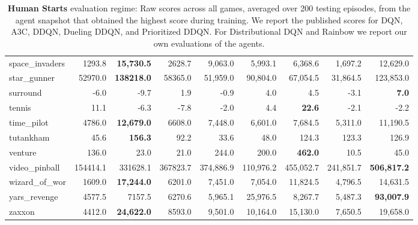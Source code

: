 \documentclass[letterpaper]{article} %
\begin{document}
\begin{table*}[t]
{\begin{tabular}{l|rrrrrrrr}
    space\_invaders &    1293.8 &   {\bf 15,730.5 }&    2628.7 &     9,063.0 &    5,993.1 &        6,368.6 &    1,697.2 &   12,629.0 \\
       star\_gunner &   52970.0 & {\bf  138218.0 }&   58365.0 &    51,959.0 &   90,804.0 &       67,054.5 &   31,864.5 &  123,853.0 \\
          surround &      -6.0 &      -9.7 &       1.9 &        -0.9 &        4.0 &            4.5 &       -3.1 &      {\bf   7.0} \\
            tennis &      11.1 &      -6.3 &      -7.8 &        -2.0 &        4.4 &          {\bf  22.6 }&       -2.1 &       -2.2 \\
        time\_pilot &    4786.0 &  {\bf  12,679.0} &    6608.0 &     7,448.0 &    6,601.0 &        7,684.5 &    5,311.0 &   11,190.5 \\
         tutankham &      45.6 &    {\bf  156.3 }&      92.2 &        33.6 &       48.0 &          124.3 &      123.3 &      126.9 \\
           venture &     136.0 &      23.0 &      21.0 &       244.0 &      200.0 &          {\bf 462.0} &       10.5 &       45.0 \\
     video\_pinball &  154414.1 &  331628.1 &  367823.7 &   374,886.9 &  110,976.2 &      455,052.7 &  241,851.7 & {\bf  506,817.2 }\\
     wizard\_of\_wor &    1609.0 &   {\bf 17,244.0 } &    6201.0 &     7,451.0 &    7,054.0 &       11,824.5 &    4,796.5 &   14,631.5 \\
      yars\_revenge &    4577.5 &    7157.5 &    6270.6 &     5,965.1 &   25,976.5 &        8,267.7 &    5,487.3 &   {\bf 93,007.9 }\\
            zaxxon &    4412.0 &  {\bf  24,622.0} &    8593.0 &     9,501.0 &   10,164.0 &       15,130.0 &    7,650.5 &   19,658.0 \\
\bottomrule
\end{tabular}
}
\caption{\textbf{Human Starts} evaluation regime: Raw scores across all games, averaged over 200 testing episodes, from the agent snapshot that obtained the highest score during training. We report the published scores for DQN, A3C, DDQN, Dueling DDQN, and Prioritized DDQN. For Distributional DQN and Rainbow we report our own evaluations of the agents.}
\label{tab:hs}
\end{table*}
\end{document}
